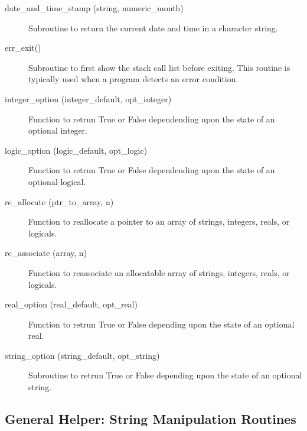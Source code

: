 \begin{description}

\label{r:date.and.time.stamp}
\item[date_and_time_stamp (string, numeric_month)] \Newline 
Subroutine to return the current date and time in a character string.

\label{r:err.exit}
\item[err_exit()] \Newline 
Subroutine to first show the stack call list before exiting.
This routine is typically used when a program detects an error condition.

\label{r:integer.option}
\item[integer_option (integer_default, opt_integer)] \Newline 
Function to retrun True or False dependending upon the state of an 
optional integer.

\label{r:logic.option}
\item[logic_option (logic_default, opt_logic)] \Newline 
Function to retrun True or False dependending upon the state of an 
optional logical.

\label{r:re.allocate}
\item[re_allocate (ptr_to_array, n)] \Newline 
Function to reallocate a pointer to an array of strings, integers, reals, or logicals.

\label{r:re.associate}
\item[re_associate (array, n)] \Newline 
Function to reassociate an allocatable array of strings, integers, reals, or logicals.

\label{r:real.option}
\item[real_option (real_default, opt_real)] \Newline 
Function to retrun True or False depending upon the state of an 
optional real.

\label{r:string.option}
\item[string_option (string_default, opt_string)] \Newline 
Subroutine to retrun True or False depending upon the state of an 
optional string.

\end{description}

\subsection{General Helper: String Manipulation Routines}

